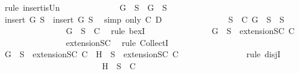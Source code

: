 \begin{isabellebody}
\ {\isacharparenleft}rule\ insert{\isacharunderscore}is{\isacharunderscore}Un{\isacharparenright}\isanewline
\ \ \ \ \ \ \ \ \ \ \ \ \isamarkupfalse%
\ {\isachardoublequoteopen}{\isacharbraceleft}G{\isacharbraceright}\ {\isasymunion}\ S{\isacharprime}\ {\isasymsubseteq}\ {\isacharbraceleft}G{\isacharbraceright}\ {\isasymunion}\ S{\isachardoublequoteclose}\isanewline
\ \ \ \ \ \ \ \ \ \ \ \ \ \ \isamarkupfalse%
\ {\isacartoucheopen}insert\ G\ S{\isacharprime}\ {\isasymsubseteq}\ insert\ G\ S{\isacartoucheclose}\ \isamarkupfalse%
\ {\isacharparenleft}simp\ only{\isacharcolon}\ C\ D{\isacharparenright}\isanewline
\ \ \ \ \ \ \ \ \ \ \ \ \isamarkupfalse%
\ \isamarkupfalse%
\ {\isachardoublequoteopen}{\isasymexists}S\ {\isasymin}\ C{\isachardot}\ {\isacharbraceleft}G{\isacharbraceright}\ {\isasymunion}\ S{\isacharprime}\ {\isasymsubseteq}\ S{\isachardoublequoteclose}\isanewline
\ \ \ \ \ \ \ \ \ \ \ \ \ \ \isamarkupfalse%
\ {\isacartoucheopen}{\isacharbraceleft}G{\isacharbraceright}\ {\isasymunion}\ S\ {\isasymin}\ C{\isacartoucheclose}\ \isamarkupfalse%
\ {\isacharparenleft}rule\ bexI{\isacharparenright}\isanewline
\ \ \ \ \ \ \ \ \ \ \ \ \isamarkupfalse%
\ \isamarkupfalse%
\ {\isachardoublequoteopen}{\isacharbraceleft}G{\isacharbraceright}\ {\isasymunion}\ S{\isacharprime}\ {\isasymin}\ {\isacharparenleft}extensionSC\ C{\isacharparenright}{\isachardoublequoteclose}\isanewline
\ \ \ \ \ \ \ \ \ \ \ \ \ \ \isamarkupfalse%
\ extensionSC\ \isamarkupfalse%
\ {\isacharparenleft}rule\ CollectI{\isacharparenright}\isanewline
\ \ \ \ \ \ \ \ \ \ \ \ \isamarkupfalse%
\ {\isachardoublequoteopen}{\isacharbraceleft}G{\isacharbraceright}\ {\isasymunion}\ S{\isacharprime}\ {\isasymin}\ {\isacharparenleft}extensionSC\ C{\isacharparenright}\ {\isasymor}\ {\isacharbraceleft}H{\isacharbraceright}\ {\isasymunion}\ S{\isacharprime}\ {\isasymin}\ {\isacharparenleft}extensionSC\ C{\isacharparenright}{\isachardoublequoteclose}\isanewline
\ \ \ \ \ \ \ \ \ \ \ \ \ \ \isamarkupfalse%
\ {\isacharparenleft}rule\ disjI{}{\isacharparenright}\isanewline
\ \ \ \ \ \ \ \ \ \ \isamarkupfalse%
\isanewline
\ \ \ \ \ \ \ \ \ \ \ \ \isamarkupfalse%
\ {\isachardoublequoteopen}{\isacharbraceleft}H{\isacharbraceright}\ {\isasymunion}\ S\ {\isasymin}\ C{\isachardoublequoteclose}\isanewline
\ \ \ \ \ \ \ \ \ \ \ \ \isamarkupfalse%

\end{isabellebody}
